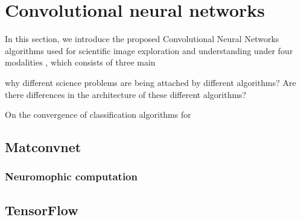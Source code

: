 \section{Convolutional neural networks}
In this section, we introduce the proposed Convolutional Neural Networks algorithms used for scientific image exploration and understanding under four modalities
, which consists of three main

why different science problems are being attached by different algorithms? Are there differences in the architecture of these different algorithms?

On the convergence of classification algorithms for

\subsection{Matconvnet}

\subsubsection{Neuromophic computation}


\subsection{TensorFlow}
